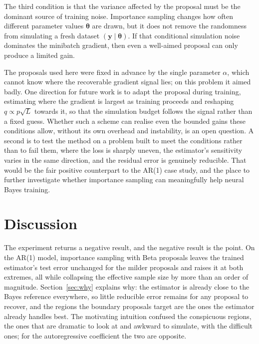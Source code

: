The third condition is that the variance affected by the proposal must be the dominant source of training noise. Importance sampling changes how often different parameter values $\bm{\theta}$ are drawn, but it does not remove the randomness from simulating a fresh dataset $(\mathbf{y}\mid\bm{\theta})$. If that conditional simulation noise dominates the minibatch gradient, then even a well-aimed proposal can only produce a limited gain.

The proposals used here were fixed in advance by the single parameter
$\alpha$, which cannot know where the recoverable gradient signal lies; on
this problem it aimed badly. One direction for future work is to adapt the
proposal during training, estimating where the gradient is largest as
training proceeds and reshaping $q \propto p\sqrt{L}$ towards it, so that
the simulation budget follows the signal rather than a fixed guess.
Whether such a scheme can realise even the bounded gains these conditions
allow, without its own overhead and instability, is an open question.
A second is to test the method on a problem built to meet the conditions rather than to fail them, where the loss is sharply uneven, the estimator's sensitivity varies in the same direction, and the
residual error is genuinely reducible. That would be the fair positive
counterpart to the AR(1) case study, and the place to further investigate whether
importance sampling can meaningfully help neural Bayes training.


\section{Discussion}
\label{sec:is-discussion}

The experiment returns a negative result, and the negative result is the
point. On the AR(1) model, importance sampling with Beta proposals leaves
the trained estimator's test error unchanged for the milder proposals and
raises it at both extremes, all while collapsing the effective sample size
by more than an order of magnitude. Section~\ref{sec:why} explains why:
the estimator is already close to the Bayes reference everywhere, so
little reducible error remains for any proposal to recover, and the
regions the boundary proposals target are the ones the estimator already
handles best. The motivating intuition confused the conspicuous regions,
the ones that are dramatic to look at and awkward to simulate, with the
difficult ones; for the autoregressive coefficient the two are opposite.

